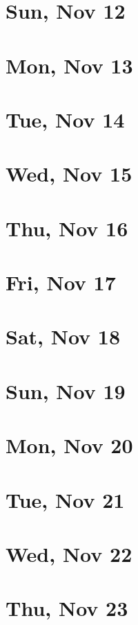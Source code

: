 	\section{Sun, Nov 12}
		
	\section{Mon, Nov 13}
		
	\section{Tue, Nov 14}
		
	\section{Wed, Nov 15}
		
	\section{Thu, Nov 16}
		
	\section{Fri, Nov 17}
		
	\section{Sat, Nov 18}
		
	\section{Sun, Nov 19}
		
	\section{Mon, Nov 20}
		
	\section{Tue, Nov 21}
		
	\section{Wed, Nov 22}
		
	\section{Thu, Nov 23}
		
